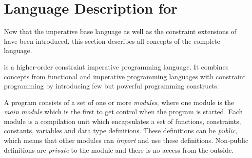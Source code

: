 



\section{Language Description for \turtle{}}
\label{sec:language-description}

Now that the imperative base language as well as the constraint
extensions of \turtle{} have been introduced, this section describes
all concepts of the complete language.

\turtle{} is a higher-order constraint imperative programming
language.  It combines concepts from functional and imperative
programming languages with constraint programming by introducing few
but powerful programming constructs.

%
A \turtle{} program consists of a set of one or more {\em modules},
where one module is the {\em main module} which is the first to get
control when the program is started.  Each module is a compilation
unit which encapsulates a set of functions, constraints, constants,
variables and data type definitions.  These definitions can be {\em
  public}, which means that other modules can {\em import} and use
these definitions.  Non-public definitions are {\em private} to the
module and there is no access from the outside.

